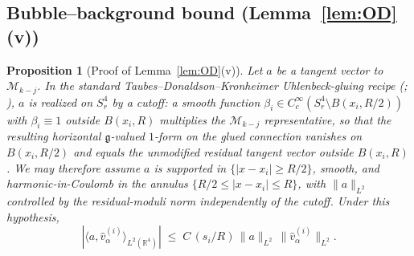 \documentclass[11pt,letterpaper]{article}
\newtheorem{proposition}[theorem]{Proposition}
\theoremstyle{definition}
\newcommand{\bbR}{\mathbb{R}}
\newcommand{\cM}{\mathcal{M}}
\newcommand{\fg}{\mathfrak{g}}
\begin{document}
\subsection{Bubble--background bound (Lemma~\ref{lem:OD}(v))}\label{app:sec:bg}

\begin{proposition}[Proof of Lemma~\ref{lem:OD}(v)]\label{app:prop:bg}
Let $a$ be a tangent vector to $\cM_{k-j}$. In the standard Taubes--Donaldson--Kronheimer Uhlenbeck-gluing recipe (\cite{Taubes1988}; \cite[\S 7.2.1]{DK1990}), $a$ is realized on $S^4_r$ by a cutoff: a smooth function $\beta_i \in C_c^\infty(S^4_r \setminus B(x_i, R/2))$ with $\beta_i \equiv 1$ outside $B(x_i, R)$ multiplies the $\cM_{k-j}$ representative, so that the resulting horizontal $\fg$-valued $1$-form on the glued connection vanishes on $B(x_i, R/2)$ and equals the unmodified residual tangent vector outside $B(x_i, R)$. We may therefore assume $a$ is supported in $\{|x - x_i| \ge R/2\}$, smooth, and harmonic-in-Coulomb in the annulus $\{R/2 \le |x-x_i| \le R\}$, with $\|a\|_{L^2}$ controlled by the residual-moduli norm independently of the cutoff. Under this hypothesis,
\[
|\langle a, \hat v_\alpha^{(i)}\rangle_{L^2(\bbR^4)}|\;\le\; C\,(s_i/R)\,\|a\|_{L^2}\,\|\hat v_\alpha^{(i)}\|_{L^2}.
\]
\end{proposition}
\end{document}
